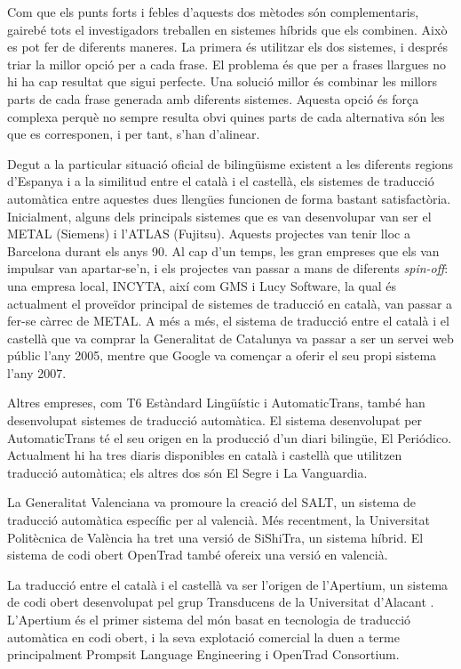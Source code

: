 \begin{multicols}{2}
Com que els punts forts i febles d’aquests dos mètodes són complementaris, gairebé tots el investigadors treballen en sistemes híbrids que els combinen. Això es pot fer de diferents maneres. La primera és utilitzar els dos sistemes, i després triar la millor opció per a cada frase. El problema és que per a frases llargues no hi ha cap resultat que sigui perfecte. Una solució millor és combinar les millors parts de cada frase generada amb diferents sistemes. Aquesta opció és força complexa perquè no sempre resulta obvi quines parts de cada alternativa són les que es corresponen, i per tant, s’han d’alinear.

Degut a la particular situació oficial de bilingüisme existent a les diferents regions d’Espanya i a la similitud entre el català i el castellà, els sistemes de traducció automàtica entre aquestes dues llengües funcionen de forma bastant satisfactòria. Inicialment, alguns dels principals sistemes que es van desenvolupar van ser el METAL (Siemens) i l’ATLAS (Fujitsu). Aquests projectes van tenir lloc a Barcelona durant els anys 90. Al cap d’un temps, les gran empreses que els van impulsar van apartar-se’n, i els projectes van passar a mans de diferents \textit{spin-off}: una empresa local, INCYTA, així com GMS i Lucy Software, la qual és actualment el proveïdor principal de sistemes de traducció en català, van passar a fer-se càrrec de METAL. A més a més, el sistema de traducció entre el català i el castellà que va comprar la Generalitat de Catalunya va passar a ser un servei web públic l’any 2005, mentre que Google va començar a oferir el seu propi sistema l’any 2007.

Altres empreses, com T6 Estàndard Lingüístic i AutomaticTrans, també han desenvolupat sistemes de traducció automàtica. El sistema desenvolupat per AutomaticTrans té el seu origen en la producció d’un diari bilingüe, El Periódico. Actualment hi ha tres diaris disponibles en català i castellà que utilitzen traducció automàtica; els altres dos són El Segre i La Vanguardia. 

La Generalitat Valenciana va promoure la creació del SALT, un sistema de traducció automàtica específic per al valencià. Més recentment, la Universitat Politècnica de València ha tret una versió de SiShiTra, un sistema híbrid. El sistema de codi obert OpenTrad també ofereix una versió en valencià. 

La traducció entre el català i el castellà va ser l’origen de l’Apertium, un sistema de codi obert desenvolupat pel grup Transducens \cite{CAT-transducens} de la Universitat d’Alacant \cite{CAT-UnivAlacant}. L’Apertium és el primer sistema del món basat en tecnologia de traducció automàtica en codi obert, i la seva explotació comercial la duen a terme principalment Prompsit Language Engineering i OpenTrad Consortium. 


\end{multicols}
